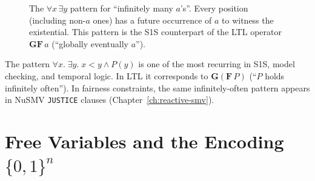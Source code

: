 \begin{figure}[ht]
  \centering
  \caption{The $\forall x\,\exists y$ pattern for ``infinitely many $a$'s''.
           Every position (including non-$a$ ones) has a future occurrence of
           $a$ to witness the existential.  This pattern is the S1S counterpart
           of the LTL operator $\mathbf{GF}\,a$ (``globally eventually $a$'').}
  \label{fig:s1s-infmany}
\end{figure}

\begin{remark}[$\forall x\,\exists y$ = $\mathbf{GF}$ in LTL]
The pattern $\forall x.\;\exists y.\;x < y \land P(y)$ is one of the most
recurring in S1S, model checking, and temporal logic.  In LTL it corresponds
to $\mathbf{G}(\mathbf{F}\,P)$ (``$P$ holds infinitely often'').  In fairness
constraints, the same infinitely-often pattern appears in NuSMV
\texttt{JUSTICE} clauses (Chapter~\ref{ch:reactive-smv}).
\end{remark}

\section{Free Variables and the Encoding \texorpdfstring{$\{0,1\}^n$}{0-1-n}}
\label{sec:s1s-encoding}

